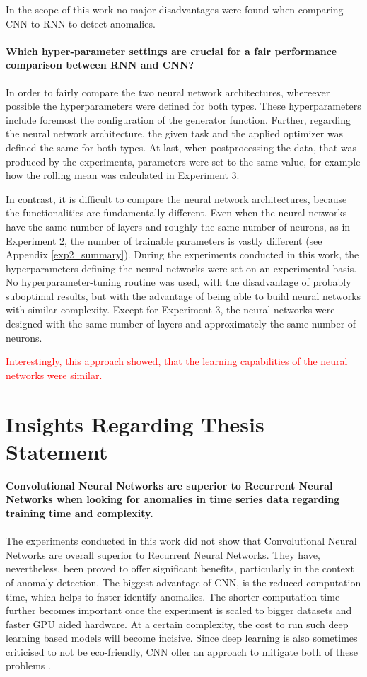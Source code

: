 In the scope of this work no major disadvantages were found when comparing CNN to RNN to detect anomalies.


\paragraph{Which hyper-parameter settings are crucial for a fair performance comparison between RNN and CNN?} In order to fairly compare the two neural network architectures, whereever possible the hyperparameters were defined for both types. These hyperparameters include foremost the configuration of the generator function. Further, regarding the neural network architecture, the given task and the applied optimizer was defined the same for both types. At last, when postprocessing the data, that was produced by the experiments, parameters were set to the same value, for example how the rolling mean was calculated in Experiment 3.

In contrast, it is difficult to compare the neural network architectures, because the functionalities are fundamentally different. Even when the neural networks have the same number of layers and roughly the same number of neurons, as in Experiment 2, the number of trainable parameters is vastly different (see Appendix \ref{exp2_summary}). During the experiments conducted in this work, the hyperparameters defining the neural networks were set on an experimental basis. No hyperparameter-tuning routine was used, with the disadvantage of probably suboptimal results, but with the advantage of being able to build neural networks with similar complexity. Except for Experiment 3, the neural networks were designed with the same number of layers and approximately the same number of neurons.

\textcolor{red}{ Interestingly, this approach showed, that the learning capabilities of the neural networks were similar.}

\section{Insights Regarding Thesis Statement}

\textbf{Convolutional Neural Networks are superior to Recurrent Neural Networks when looking for anomalies in time series data regarding training time and complexity.}\\
\\
The experiments conducted in this work did not show that Convolutional Neural Networks are overall superior to Recurrent Neural Networks. They have, nevertheless, been proved to offer significant benefits, particularly in the context of anomaly detection. The biggest advantage of CNN, is the reduced computation time, which helps to faster identify anomalies. The shorter computation time further becomes important once the experiment is scaled to bigger datasets and faster GPU aided hardware. At a certain complexity, the cost to run such deep learning based models will become incisive. Since deep learning is also sometimes criticised to not be eco-friendly, CNN offer an approach to mitigate both of these problems \parencite{Walleser2021}.

